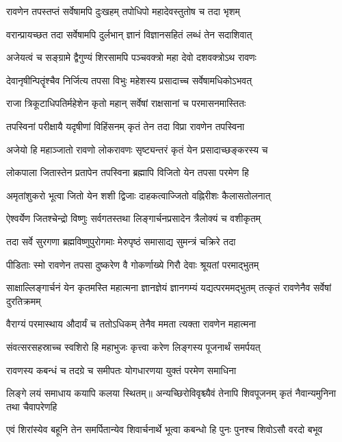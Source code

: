 \twolineshloka
{रावणेन तपस्तप्तं सर्वेषामपि दुःखहम्}
{तपोधिपो महादेवस्तुतोष च तदा भृशम्}%

\twolineshloka
{वरान्प्रायच्छत तदा सर्वेषामपि दुर्लभान्}
{ज्ञानं विज्ञानसहितं लब्धं तेन सदाशिवात्}%

\twolineshloka
{अजेयत्वं च सङ्ग्रामे द्वैगुण्यं शिरसामपि}
{पञ्चवक्त्रो महा देवो दशवक्त्रोऽथ रावणः}%

\twolineshloka
{देवानृषीन्पितॄंश्चैव निर्जित्य तपसा विभुः}
{महेशस्य प्रसादाच्च सर्वेषामधिकोऽभवत्}%

\twolineshloka
{राजा त्रिकूटाधिपतिर्महेशेन कृतो महान्}
{सर्वेषां राक्षसानां च परमासनमास्तितः}%

\twolineshloka
{तपस्विनां परीक्षायै यदृषीणां विहिंसनम्}
{कृतं तेन तदा विप्रा रावणेन तपस्विना}%

\twolineshloka
{अजेयो हि महाञ्जातो रावणो लोकरावणः}
{सृष्ट्यन्तरं कृतं येन प्रसादाच्छङ्करस्य च}%

\twolineshloka
{लोकपाला जितास्तेन प्रतापेन तपस्विना}
{ब्रह्मापि विजितो येन तपसा परमेण हि}%

\twolineshloka
{अमृतांशुकरो भूत्वा जितो येन शशी द्विजाः}
{दाहकत्वाज्जितो वह्निरीशः कैलासतोलनात्}%

\twolineshloka
{ऐश्वर्येण जितश्चेन्द्रो विष्णुः सर्वगतस्तथा}
{लिङ्गार्चनप्रसादेन त्रैलोक्यं च वशीकृतम्}%

\twolineshloka
{तदा सर्वे सुरगणा ब्रह्मविष्णुपुरोगमाः}
{मेरुपृष्ठं समासाद्य सुमन्त्रं चक्रिरे तदा}%

\twolineshloka
{पीडिताः स्मो रावणेन तपसा दुष्करेण वै}
{गोकर्णाख्ये गिरौ देवाः श्रूयतां परमाद्भुतम्}%

\threelineshloka
{साक्षाल्लिङ्गार्चनं येन कृतमस्ति महात्मना}
{ज्ञानज्ञेयं ज्ञानगम्यं यद्यत्परममद्भुतम्}
{तत्कृतं रावणेनैव सर्वेषां दुरतिक्रमम्}%

\twolineshloka
{वैराग्यं परमास्थाय औदार्यं च ततोऽधिकम्}
{तेनैव ममता त्यक्ता रावणेन महात्मना}%

\twolineshloka
{संवत्सरसहस्राच्च स्वशिरो हि महाभुजः}
{कृत्त्वा करेण लिङ्गस्य पूजनार्थं समर्पयत्}%

\twolineshloka
{रावणस्य कबन्धं च तदग्रे च समीपतः}
{योगधारणया युक्तं परमेण समाधिना}%

\threelineshloka
{लिङ्गे लयं समाधाय कयापि कलया स्थितम्॥}
{अन्यच्छिरोविवृश्च्यैवं तेनापि शिवपूजनम्}
{कृतं नैवान्यमुनिना तथा चैवापरेणहि}%

\twolineshloka
{एवं शिरांस्येव बहूनि तेन समर्पितान्येव शिवार्चनार्थे}
{भूत्वा कबन्धो हि पुनः पुनश्च शिवोऽसौ वरदो बभूव}%

